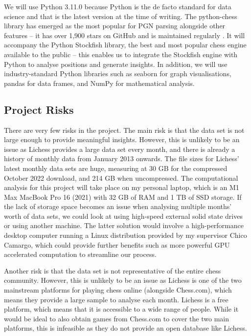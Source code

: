 \documentclass[%
 superscriptaddress,
showpacs,preprintnumbers,
 amsmath,
 amssymb,
 aps,
 pra,
showkeys,
onecolumn,
notitlepage,
11pt,
tightenlines      %
]{revtex4-1}
\begin{document}
We will use Python 3.11.0 because Python is the de facto standard for data science \cite{pythonForDataScience} and that is the latest version at the time of writing. The python-chess library has emerged as the most popular for PGN parsing alongside other features -- it has over 1,900 stars on GitHub and is maintained regularly \cite{pythonChessLibrary}. It will accompany the Python Stockfish library, the best and most popular chess engine available to the public \cite{aboutStockfish} -- this enables us to integrate the Stockfish engine with Python to analyse positions and generate insights. In addition, we will use industry-standard Python libraries such as seaborn for graph visualisations, pandas for data frames, and NumPy for mathematical analysis.

\subsection{Project Risks}
There are very few risks in the project. The main risk is that the data set is not large enough to provide meaningful insights. However, this is unlikely to be an issue as Lichess provides a large data set every month, and there is already a history of monthly data from January 2013 onwards. The file sizes for Lichess' latest monthly data sets are huge, measuring at 30 GB for the compressed October 2022 download, and 214 GB when uncompressed. The computational analysis for this project will take place on my personal laptop, which is an M1 Max MacBook Pro 16 (2021) with 32 GB of RAM and 1 TB of SSD storage. If the lack of storage space becomes an issue when analysing multiple months' worth of data sets, we could look at using high-speed external solid state drives or using another machine. The latter solution would involve a high-performance desktop computer running a Linux distribution provided by my supervisor Chico Camargo, which could provide further benefits such as more powerful GPU accelerated computation to streamline our process.

Another risk is that the data set is not representative of the entire chess community. However, this is unlikely to be an issue as Lichess is one of the two mainstream platforms for playing chess online (alongside Chess.com), which means they provide a large sample to analyse each month. Lichess is a free platform, which means that it is accessible to a wide range of people. While it would be ideal to also obtain games from Chess.com to cover the two main platforms, this is infeasible as they do not provide an open database like Lichess.
\end{document}
